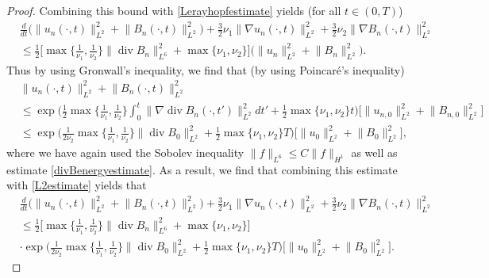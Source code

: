 \documentclass[12pt,a4paper]{article}
\theoremstyle{definition}
\theoremstyle{remark}
\numberwithin{equation}{section}
\DeclareMathOperator{\Div}{div}
\begin{document}
\begin{proof}
Combining this bound with \eqref{Lerayhopfestimate} yields (for all $t \in (0,T)$)
\begin{align}
&\frac{d}{dt} \bigg( \lVert u_n (\cdot, t) \rVert_{L^2}^2 + \lVert B_n (\cdot, t) \rVert_{L^2}^2 \bigg) + \frac{3}{2} \nu_1 \lVert \nabla u_n (\cdot, t) \rVert_{L^2}^2 + \frac{3}{2} \nu_2 \lVert \nabla B_n (\cdot, t) \rVert_{L^2}^2 \nonumber \\
&\leq \frac{1}{2} \bigg[ \max \bigg\{ \frac{1}{\nu_1}, \frac{1}{\nu_2} \bigg\} \lVert \Div B_n \rVert_{L^6}^2 + \max \{ \nu_1, \nu_2 \} \bigg] \bigg( \lVert u_n \rVert_{L^2}^2 + \lVert B_n \rVert_{L^2}^2 \bigg). \label{L2estimate}
\end{align}
Thus by using Gronwall's inequality, we find that (by using Poincaré's inequality)
\begin{align*}
&\lVert u_n (\cdot, t) \rVert_{L^2}^2 + \lVert B_n (\cdot, t) \rVert_{L^2}^2 \\ 
&\leq \exp \bigg( \frac{1}{2} \max \bigg\{ \frac{1}{\nu_1}, \frac{1}{\nu_2} \bigg\} \int_0^t \lVert \nabla \Div B_n (\cdot, t') \rVert_{L^2}^2 dt' + \frac{1}{2} \max \{ \nu_1, \nu_2 \} t \bigg) \bigg[ \lVert u_{n,0} \rVert_{L^2}^2 + \lVert B_{n,0} \rVert_{L^2}^2 \bigg] \\
&\leq \exp \bigg( \frac{1}{2 \nu_2} \max \bigg\{ \frac{1}{\nu_1}, \frac{1}{\nu_2} \bigg\} \lVert \Div B_{0} \rVert_{L^2}^2 + \frac{1}{2} \max \{ \nu_1, \nu_2 \} T \bigg) \bigg[ \lVert u_{0} \rVert_{L^2}^2 + \lVert B_{0} \rVert_{L^2}^2 \bigg],
\end{align*}
where we have again used the Sobolev inequality $\lVert f \rVert_{L^6} \leq C \lVert f \rVert_{H^1}$ as well as estimate \eqref{divBenergyestimate}. As a result, we find that combining this estimate with \eqref{L2estimate} yields that
\begin{align*}
&\frac{d}{dt} \bigg( \lVert u_n (\cdot, t) \rVert_{L^2}^2 + \lVert B_n (\cdot, t) \rVert_{L^2}^2 \bigg) + \frac{3}{2} \nu_1 \lVert \nabla u_n (\cdot, t) \rVert_{L^2}^2 + \frac{3}{2} \nu_2 \lVert \nabla B_n (\cdot, t) \rVert_{L^2}^2 \nonumber \\
&\leq \frac{1}{2} \bigg[ \max \bigg\{ \frac{1}{\nu_1}, \frac{1}{\nu_2} \bigg\} \lVert \Div B_n \rVert_{L^6}^2 + \max \{ \nu_1, \nu_2 \} \bigg] \\
&\cdot \exp \bigg( \frac{1}{2 \nu_2} \max \bigg\{ \frac{1}{\nu_1}, \frac{1}{\nu_2} \bigg\} \lVert \Div B_{0} \rVert_{L^2}^2 + \frac{1}{2} \max \{ \nu_1, \nu_2 \} T \bigg) \bigg[ \lVert u_{0} \rVert_{L^2}^2 + \lVert B_{0} \rVert_{L^2}^2 \bigg].
\end{align*}

\end{proof}
\end{document}

